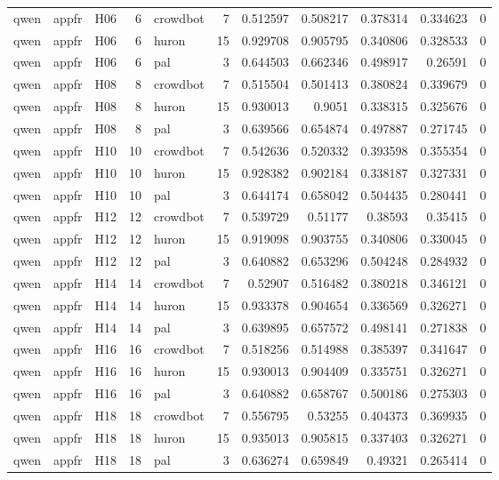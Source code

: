 \begin{longtable}{lllrlrrrrrr}
qwen & appfr & H06 & 6 & crowdbot & 7 & 0.512597 & 0.508217 & 0.378314 & 0.334623 & 0 \\
qwen & appfr & H06 & 6 & huron & 15 & 0.929708 & 0.905795 & 0.340806 & 0.328533 & 0 \\
qwen & appfr & H06 & 6 & pal & 3 & 0.644503 & 0.662346 & 0.498917 & 0.26591 & 0 \\
qwen & appfr & H08 & 8 & crowdbot & 7 & 0.515504 & 0.501413 & 0.380824 & 0.339679 & 0 \\
qwen & appfr & H08 & 8 & huron & 15 & 0.930013 & 0.9051 & 0.338315 & 0.325676 & 0 \\
qwen & appfr & H08 & 8 & pal & 3 & 0.639566 & 0.654874 & 0.497887 & 0.271745 & 0 \\
qwen & appfr & H10 & 10 & crowdbot & 7 & 0.542636 & 0.520332 & 0.393598 & 0.355354 & 0 \\
qwen & appfr & H10 & 10 & huron & 15 & 0.928382 & 0.902184 & 0.338187 & 0.327331 & 0 \\
qwen & appfr & H10 & 10 & pal & 3 & 0.644174 & 0.658042 & 0.504435 & 0.280441 & 0 \\
qwen & appfr & H12 & 12 & crowdbot & 7 & 0.539729 & 0.51177 & 0.38593 & 0.35415 & 0 \\
qwen & appfr & H12 & 12 & huron & 15 & 0.919098 & 0.903755 & 0.340806 & 0.330045 & 0 \\
qwen & appfr & H12 & 12 & pal & 3 & 0.640882 & 0.653296 & 0.504248 & 0.284932 & 0 \\
qwen & appfr & H14 & 14 & crowdbot & 7 & 0.52907 & 0.516482 & 0.380218 & 0.346121 & 0 \\
qwen & appfr & H14 & 14 & huron & 15 & 0.933378 & 0.904654 & 0.336569 & 0.326271 & 0 \\
qwen & appfr & H14 & 14 & pal & 3 & 0.639895 & 0.657572 & 0.498141 & 0.271838 & 0 \\
qwen & appfr & H16 & 16 & crowdbot & 7 & 0.518256 & 0.514988 & 0.385397 & 0.341647 & 0 \\
qwen & appfr & H16 & 16 & huron & 15 & 0.930013 & 0.904409 & 0.335751 & 0.326271 & 0 \\
qwen & appfr & H16 & 16 & pal & 3 & 0.640882 & 0.658767 & 0.500186 & 0.275303 & 0 \\
qwen & appfr & H18 & 18 & crowdbot & 7 & 0.556795 & 0.53255 & 0.404373 & 0.369935 & 0 \\
qwen & appfr & H18 & 18 & huron & 15 & 0.935013 & 0.905815 & 0.337403 & 0.326271 & 0 \\
qwen & appfr & H18 & 18 & pal & 3 & 0.636274 & 0.659849 & 0.49321 & 0.265414 & 0 \\

\end{longtable}
